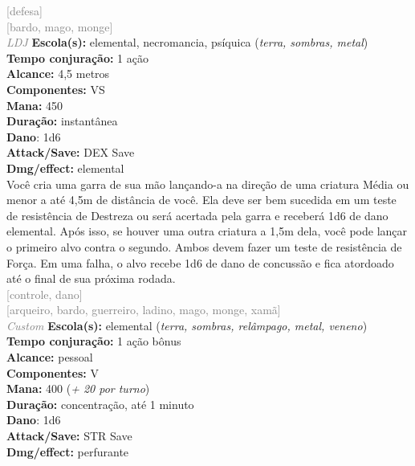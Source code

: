 \documentclass{RPG_Adventure}[2021/10/20]
\begin{document}
{\scriptsize \textcolor{gray}{[defesa]\\}}
{\scriptsize \textcolor{gray}{[bardo, mago, monge]\\}}
{\tiny \textcolor{gray}{\textit{LDJ}}}\jump{}
{\small \t \textbf{Escola(s):} elemental, necromancia, psíquica (\textit{terra, sombras, metal})\\\t \textbf{Tempo conjuração:} 1 ação\\\t \textbf{Alcance:} 4,5 metros\\\t \textbf{Componentes:} VS\\\t \textbf{Mana:} 450\\\t \textbf{Duração:} instantânea\\\t \textbf{Dano}: 1d6\\\t \textbf{Attack/Save:} DEX Save\\\t \textbf{Dmg/effect:} elemental\\}
{\normalsize Você cria uma garra de sua mão lançando-a na direção de uma criatura Média ou menor a até 4,5m de distância de você. Ela deve ser bem sucedida em um teste de resistência de Destreza ou será acertada pela garra e receberá 1d6 de dano elemental. Após isso, se houver uma outra criatura a 1,5m dela, você pode lançar o primeiro alvo contra o segundo. Ambos devem fazer um teste de resistência de Força. Em uma falha, o alvo recebe 1d6 de dano de concussão e fica atordoado até o final de sua próxima rodada.\\}
{\scriptsize \textcolor{gray}{[controle, dano]\\}}
{\scriptsize \textcolor{gray}{[arqueiro, bardo, guerreiro, ladino, mago, monge, xamã]\\}}
{\tiny \textcolor{gray}{\textit{Custom}}}\jump{}
{\small \t \textbf{Escola(s):} elemental (\textit{terra, sombras, relâmpago, metal, veneno})\\\t \textbf{Tempo conjuração:} 1 ação bônus\\\t \textbf{Alcance:} pessoal\\\t \textbf{Componentes:} V\\\t \textbf{Mana:} 400 (\textit{+ 20 por turno})\\\t \textbf{Duração:} concentração, até 1 minuto\\\t \textbf{Dano}: 1d6\\\t \textbf{Attack/Save:} STR Save\\\t \textbf{Dmg/effect:} perfurante\\}
\end{document}
